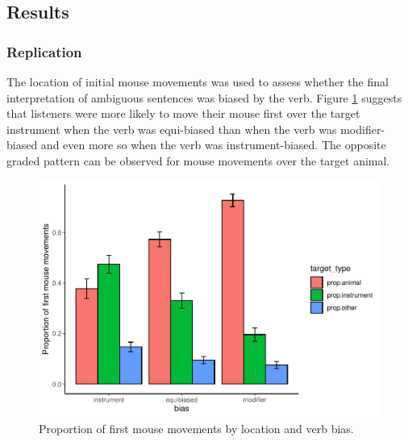 \documentclass[
  english,
  man,floatsintext]{apa6}
\begin{document}
\hypertarget{results-3}{%
\subsection{Results}\label{results-3}}

\hypertarget{replication-2}{%
\subsubsection{Replication}\label{replication-2}}

The location of initial mouse movements was used to assess whether the final interpretation of ambiguous sentences was biased by the verb. Figure \ref{fig:E4-mouse-moves-fig} suggests that listeners were more likely to move their mouse first over the target instrument when the verb was equi-biased than when the verb was modifier-biased and even more so when the verb was instrument-biased. The opposite graded pattern can be observed for mouse movements over the target animal.

\begin{figure}
\centering
\includegraphics{manuscript_files/figure-latex/E4-mouse-moves-fig-1.pdf}
\caption{\label{fig:E4-mouse-moves-fig}Proportion of first mouse movements by location and verb bias.}
\end{figure}
\end{document}
